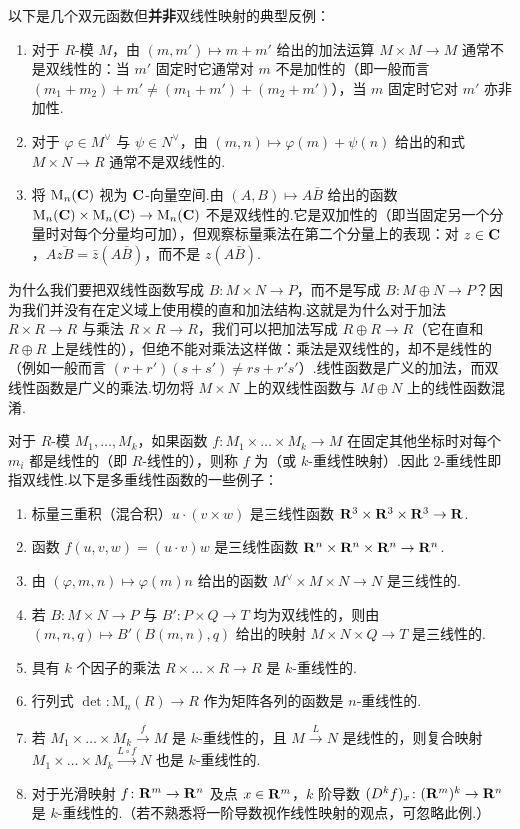 以下是几个双元函数但\textbf{并非}双线性映射的典型反例：
\begin{enumerate}
  \item 对于 $R$-模 $M$，由 $(m, m') \mapsto m + m'$ 给出的加法运算 $M \times M \to M$ 通常不是双线性的：当 $m'$ 固定时它通常对 $m$ 不是加性的（即一般而言 $(m_1 + m_2) + m' \neq (m_1 + m') + (m_2 + m')$），当 $m$ 固定时它对 $m'$ 亦非加性.
  \item 对于 $\varphi \in M^\vee$ 与 $\psi \in N^\vee$，由 $(m, n) \mapsto \varphi(m) + \psi(n)$ 给出的和式 $M \times N \to R$ 通常不是双线性的.
  \item 将 $\mathrm{M}_n(\mathbf{C})$ 视为 $\mathbf{C}$-向量空间.由 $(A, B) \mapsto A\bar{B}$ 给出的函数 $\mathrm{M}_n(\mathbf{C}) \times \mathrm{M}_n(\mathbf{C}) \to \mathrm{M}_n(\mathbf{C})$ 不是双线性的.它是双加性的（即当固定另一个分量时对每个分量均可加），但观察标量乘法在第二个分量上的表现：对 $z \in \mathbf{C}$，$A\overline{zB} = \bar{z}(A\bar{B})$，而不是 $z(A\bar{B})$.
\end{enumerate}

为什么我们要把双线性函数写成 $B \colon M \times N \to P$，而不是写成 $B \colon M \oplus N \to P$？因为我们并没有在定义域上使用模的直和加法结构.这就是为什么对于加法 $R \times R \to R$ 与乘法 $R \times R \to R$，我们可以把加法写成 $R \oplus R \to R$（它在直和 $R \oplus R$ 上是线性的），但绝不能对乘法这样做：乘法是双线性的，却不是线性的（例如一般而言 $(r + r')(s + s') \neq rs + r's'$）.线性函数是广义的加法，而双线性函数是广义的乘法.切勿将 $M \times N$ 上的双线性函数与 $M \oplus N$ 上的线性函数混淆.

对于 $R$-模 $M_1, \dots, M_k$，如果函数 $f \colon M_1 \times \dots \times M_k \to M$ 在固定其他坐标时对每个 $m_i$ 都是线性的（即 $R$-线性的），则称 $f$ 为（或 $k$-重线性映射）.因此 $2$-重线性即指双线性.以下是多重线性函数的一些例子：
\begin{enumerate}
  \item 标量三重积（混合积）$u \cdot (v \times w)$ 是三线性函数 $\mathbf{R}^3 \times \mathbf{R}^3 \times \mathbf{R}^3 \to \mathbf{R}$.
  \item 函数 $f(u, v, w) = (u \cdot v)w$ 是三线性函数 $\mathbf{R}^n \times \mathbf{R}^n \times \mathbf{R}^n \to \mathbf{R}^n$.
  \item 由 $(\varphi, m, n) \mapsto \varphi(m)n$ 给出的函数 $M^\vee \times M \times N \to N$ 是三线性的.
  \item 若 $B \colon M \times N \to P$ 与 $B' \colon P \times Q \to T$ 均为双线性的，则由 $(m, n, q) \mapsto B'(B(m, n), q)$ 给出的映射 $M \times N \times Q \to T$ 是三线性的.
  \item 具有 $k$ 个因子的乘法 $R \times \dots \times R \to R$ 是 $k$-重线性的.
  \item 行列式 $\det \colon \mathrm{M}_n(R) \to R$ 作为矩阵各列的函数是 $n$-重线性的.
  \item 若 $M_1 \times \dots \times M_k \xrightarrow{f} M$ 是 $k$-重线性的，且 $M \xrightarrow{L} N$ 是线性的，则复合映射 $M_1 \times \dots \times M_k \xrightarrow{L \circ f} N$ 也是 $k$-重线性的.
  \item 对于光滑映射 $f \colon \mathbf{R}^m \to \mathbf{R}^n$ 及点 $x \in \mathbf{R}^m$，$k$ 阶导数 $(D^k f)_x \colon (\mathbf{R}^m)^k \to \mathbf{R}^n$ 是 $k$-重线性的.（若不熟悉将一阶导数视作线性映射的观点，可忽略此例.）
\end{enumerate}

